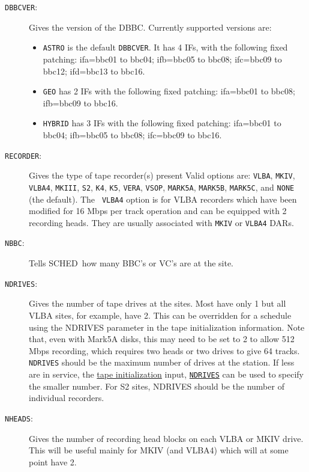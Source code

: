 \documentclass{report}
\newcommand{\schedb}{{\sc SCHED~}}
\begin{document}
\begin{description}
\item [{\tt DBBCVER}: \label{ST:DBBCVER}] Gives the version of the DBBC.
Currently supported versions are:
\begin{itemize} 
      \item {\tt ASTRO} is the default {\tt DBBCVER}. It has 4
            IFs, with the following fixed patching: ifa=bbc01 to
            bbc04; ifb=bbc05 to bbc08; ifc=bbc09 to bbc12;
            ifd=bbc13 to bbc16. 
      \item {\tt GEO} has 2 IFs with the following fixed patching:
            ifa=bbc01 to bbc08; ifb=bbc09 to bbc16.
      \item {\tt HYBRID} has 3 IFs with the following fixed
            patching: ifa=bbc01 to bbc04; ifb=bbc05 to bbc08;
            ifc=bbc09 to bbc16.
\end{itemize}

\item [{\tt RECORDER}:] Gives the type of tape recorder(s) present
Valid options are: {\tt VLBA}, {\tt MKIV}, {\tt VLBA4}, {\tt MKIII},
{\tt S2}, {\tt K4}, {\tt K5}, {\tt VERA}, {\tt VSOP}, {\tt MARK5A},
{\tt MARK5B}, {\tt MARK5C}, and {\tt NONE} (the default).  The {\tt
VLBA4} option is for VLBA recorders which have been modified for 16
Mbps per track operation and can be equipped with 2 recording heads.
They are usually associated with {\tt MKIV} or {\tt VLBA4} DARs.

\item[{\tt NBBC}:] Tells \schedb how many BBC's or VC's are at the
site.

\item[{\tt NDRIVES}:] Gives the number of tape drives at the sites.
Most have only 1 but all VLBA sites, for example, have 2.  This can be
overridden for a schedule using the NDRIVES parameter in the tape
initialization information.  Note that, even with Mark5A disks, this
may need to be set to 2 to allow 512 Mbps recording, which requires
two heads or two drives to give 64 tracks.  {\tt NDRIVES} should be
the maximum number of drives at the station.  If less are in service,
the 
{\hyperref[SEC:TPINI]{tape initialization}} input, 
{\hyperref[TP:NDRIVES]{{\tt NDRIVES}}}
can be used to specify the smaller number.  For
S2 sites, NDRIVES should be the number of individual recorders.

\item[{\tt NHEADS}:] Gives the number of recording head blocks on
each VLBA or MKIV drive.  This will be useful mainly for MKIV
(and VLBA4) which will at some point have 2.


\end{description}
\end{document}
